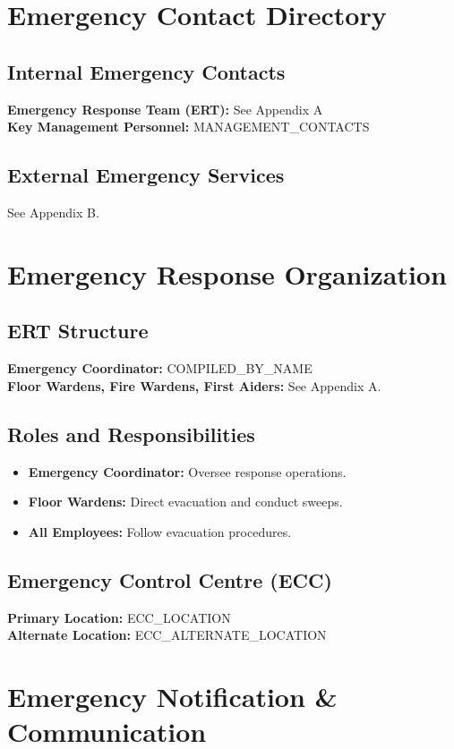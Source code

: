 \documentclass[12pt]{article}
\begin{document}
\section{Emergency Contact Directory}

\subsection{Internal Emergency Contacts}
\textbf{Emergency Response Team (ERT):} See Appendix A\\
\textbf{Key Management Personnel:} {{MANAGEMENT_CONTACTS}}

\subsection{External Emergency Services}
See Appendix B.

\section{Emergency Response Organization}

\subsection{ERT Structure}
\textbf{Emergency Coordinator:} {{COMPILED_BY_NAME}}\\
\textbf{Floor Wardens, Fire Wardens, First Aiders:} See Appendix A.

\subsection{Roles and Responsibilities}
\begin{itemize}
    \item \textbf{Emergency Coordinator:} Oversee response operations.
    \item \textbf{Floor Wardens:} Direct evacuation and conduct sweeps.
    \item \textbf{All Employees:} Follow evacuation procedures.
\end{itemize}

\subsection{Emergency Control Centre (ECC)}
\textbf{Primary Location:} {{ECC_LOCATION}}\\
\textbf{Alternate Location:} {{ECC_ALTERNATE_LOCATION}}

\section{Emergency Notification \& Communication}
\end{document}
